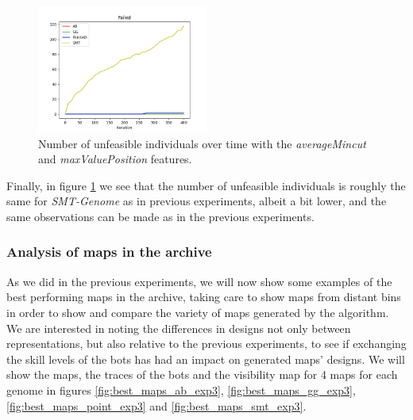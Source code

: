 \begin{figure}[H]
    \centering
    \includegraphics[width=0.5\textwidth]{images/Exp3/failed.png}
    \caption{Number of unfeasible individuals over time with the \textit{averageMincut} and \textit{maxValuePosition} features.}
    \label{fig:failed_exp3}
\end{figure}

Finally, in figure \ref{fig:failed_exp3} we see that the number of unfeasible individuals is roughly the same for \textit{SMT-Genome} as in previous experiments, albeit a bit lower, and the same observations can be made as in the previous experiments.

\subsubsection*{Analysis of maps in the archive}
As we did in the previous experiments, we will now show some examples of the best performing maps in the archive, taking care to show maps from distant bins in order to show and compare the variety of maps generated by the algorithm. We are interested in noting the differences in designs not only between representations, but also relative to the previous experiments, to see if exchanging the skill levels of the bots has had an impact on generated maps' designs. We will show the maps, the traces of the bots and the visibility map for 4 maps for each genome in figures \cref{fig:best_maps_ab_exp3}, \cref{fig:best_maps_gg_exp3}, \cref{fig:best_maps_point_exp3} and \cref{fig:best_maps_smt_exp3}.

